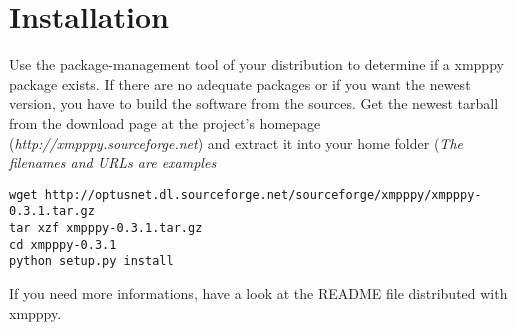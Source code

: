 \chapter{Installation}



Use the package-management tool of your distribution to determine if a xmpppy package exists.
If there are no adequate packages or if you want the newest version, you have to build the software from the sources.
\newline
Get the newest tarball from the download page at the project's homepage (\textit{http://xmpppy.sourceforge.net}) and extract it into your home folder (\textit{The filenames and URLs are examples}
\begin{verbatim}
wget http://optusnet.dl.sourceforge.net/sourceforge/xmpppy/xmpppy-0.3.1.tar.gz
tar xzf xmpppy-0.3.1.tar.gz
cd xmpppy-0.3.1
python setup.py install
\end{verbatim}
If you need more informations, have a look at the README file distributed with xmpppy.


